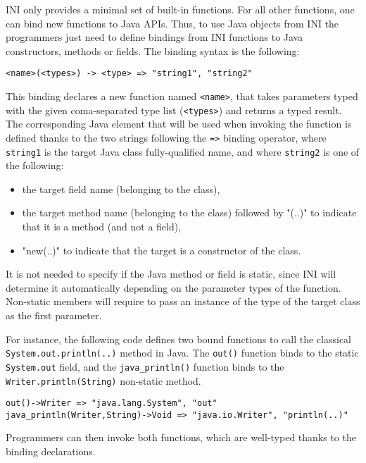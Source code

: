 \documentclass[11pt]{report}
\begin{document}
INI only provides a minimal set of built-in functions. For all other functions, one can bind new functions to Java APIs. Thus, to use Java objects from INI the programmers just need to define bindings from INI functions to Java constructors, methods or fields. The binding syntax is the following:

\begin{verbatim}
<name>(<types>) -> <type> => "string1", "string2"
\end{verbatim}

This binding declares a new function named \texttt{<name>}, that takes parameters typed with the given coma-separated type list (\texttt{<types>}) and returns a typed result. The corresponding Java element that will be used when invoking the function is defined thanks to the two strings following the \texttt{=>} binding operator, where \texttt{string1} is the target Java class fully-qualified name, and where \texttt{string2} is one of the following:

\begin{itemize}
\item the target field name (belonging to the class),
\item the target method name (belonging to the class) followed by "(..)" to indicate that it is a method (and not a field),
\item "new(..)" to indicate that the target is a constructor of the class.
\end{itemize}

It is not needed to specify if the Java method or field is static, since INI will determine it automatically depending on the parameter types of the function. Non-static members will require to pass an instance of the type of the target class as the first parameter.

For instance, the following code defines two bound functions to call the classical \texttt{System.out.println(..)} method in Java. The \texttt{out()} function binds to the static \texttt{System.out} field, and the \texttt{java\_println()} function binds to the \texttt{Writer.println(String)} non-static method.

{ \small
\begin{verbatim}
out()->Writer => "java.lang.System", "out"
java_println(Writer,String)->Void => "java.io.Writer", "println(..)"
\end{verbatim} }

Programmers can then invoke both functions, which are well-typed thanks to the binding declarations.
\end{document}
